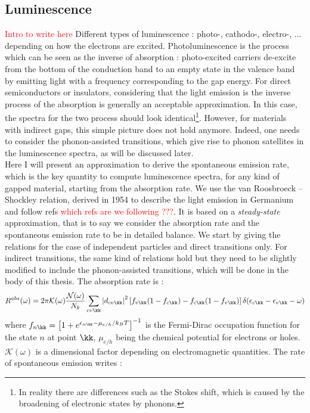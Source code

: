 \subsection{Luminescence}
\textcolor{red}{Intro to write here} Different types of luminescence : photo-, cathodo-, electro-, ... depending on how the electrons are excited.
Photoluminescence is the process which can be seen as the inverse of absorption : photo-excited carriers de-excite from the bottom of the conduction band to an empty state in the valence band by emitting light with a frequency corresponding to the gap energy. For direct semiconductors or insulators, considering that the light emission is the inverse process of the absorption is generally an acceptable approximation. In this case, the spectra for the two process should look identical\footnote[1]{In reality there are differences such as the Stokes shift, which is caused by the broadening of electronic states by phonons.}. However, for materials with indirect gaps, this simple picture does not hold anymore. Indeed, one needs to consider the phonon-assisted transitions, which give rise to phonon satellites in the luminescence spectra, as will be discussed later. \\
Here I will present an approximation to derive the spontaneous emission rate, which is the key quantity to compute luminescence spectra, for any kind of gapped material, starting from the absorption rate. We use the van Roosbroeck -- Shockley relation, derived in 1954 to describe the light emission in Germanium \cite{van1954photon} and follow refs \textcolor{red}{which refs are we following ???}. It is based on a \emph{steady-state} approximation, that is to say we consider the absorption rate and the spontaneous emission rate to be in detailed balance. We start by giving the relations for the case of independent particles and direct transitions only. For indirect transitions, the same kind of relations hold but they need to be slightly modified to include the phonon-assisted transitions, which will be done in the body of this thesis. The absorption rate is :
\begin{equation}
	R^{abs}(\omega) = 2\pi \mathcal{K}(\omega) \frac{\mathcal{N} (\omega)}{N_k} \sum_{cv\kk} \left|d_{cv\kk} \right|^2 \left[ f_{v\kk}(1-f_{c\kk}) - f_{c\kk}(1-f_{v\kk})\right] \delta(\epsilon_{c\kk} - \epsilon_{v\kk} - \omega)
\end{equation}
where $f_{n\kk} = \left[ 1 + e^{\epsilon_{n\kk} - \mu_{e/h}/k_BT} \right]^{-1}$ is the Fermi-Dirac occupation function for the state $n$ at point $\kk$, $\mu_{e/h}$ being the chemical potential for electrons or holes. $\mathcal{K}(\omega)$ is a dimensional factor depending on electromagnetic quantities. The rate of spontaneous emission writes : 
